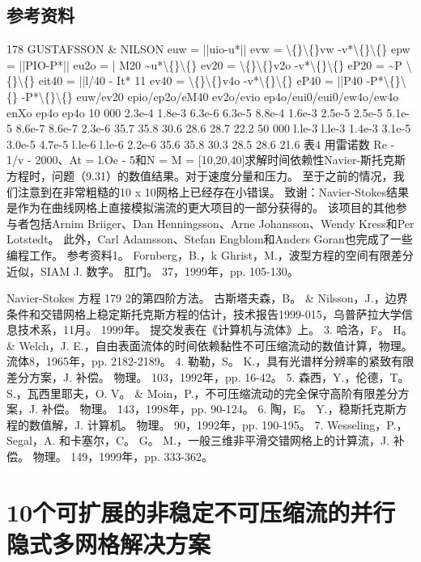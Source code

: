 \documentclass[UTF8,11pt,a4paper,openany,fontset=fandol]{ctexbook}
\begin{document}
\section{参考资料}
178 GUSTAFSSON \& NILSON euw = ||uio-u*|| evw = \textbackslash\{\}\textbackslash\{\}vw -v*\textbackslash\{\}\textbackslash\{\} epw = ||PIO-P*|| eu2o = | M20 \textasciitilde{}u*\textbackslash\{\}\textbackslash\{\} ev20 = \textbackslash\{\}\textbackslash\{\}v2o -v*\textbackslash\{\}\textbackslash\{\} eP20 = \textasciitilde{}P \textbackslash\{\}\textbackslash\{\} eit40 = ||l/40 - It* 11 ev40 = \textbackslash\{\}\textbackslash\{\}v4o -v*\textbackslash\{\}\textbackslash\{\} eP40 = ||P40 -P*\textbackslash\{\}\textbackslash\{\} -P*\textbackslash\{\}\textbackslash\{\} euw/ev20 epio/ep2o/eM40 ev2o/evio ep4o/eui0/eui0/ew4o/ew4o enXo ep4o ep4o 10 000 2.3e-4 1.8e-3 6.3e-6 6.3e-5 8.8e-4 1.6e-3 2.5e-5 2.5e-5 5.1e-5 8.6e-7 8.6e-7 2.3e-6 35.7 35.8 30.6 28.6 28.7 22.2 50 000 l.le-3 l.le-3 1.4e-3 3.1e-5 3.0e-5 4.7e-5 l.le-6 l.le-6 2.2e-6 35.6 35.8 30.3 28.5 28.6 21.6 表4 用雷诺数 Re - 1/v - 2000、At = l.Oe - 5和N = M = [10,20,40]求解时间依赖性Navier-斯托克斯方程时，问题（9.31）的数值结果。对于速度分量和压力。 至于之前的情况，我们注意到在非常粗糙的10 x 10网格上已经存在小错误。 致谢：Navier-Stokes结果是作为在曲线网格上直接模拟湍流的更大项目的一部分获得的。 该项目的其他参与者包括Arnim Briiger、Dan Henningsson、Arne Johansson、Wendy Kress和Per Lotstedt。 此外，Carl Adamsson、Stefan Engblom和Anders Goran也完成了一些编程工作。 参考资料1。 Fornberg，B.，k Ghrist，M.，波型方程的空间有限差分近似，SIAM J. 数字。 肛门。 37，1999年，pp. 105-130。

Navier-Stokes 方程 179 2的第四阶方法。 古斯塔夫森，B。 \& Nilsson，J.，边界条件和交错网格上稳定斯托克斯方程的估计，技术报告1999-015，乌普萨拉大学信息技术系，11月。 1999年。 提交发表在《计算机与流体》上。 3. 哈洛，F。 H。 \& Welch，J. E.，自由表面流体的时间依赖黏性不可压缩流动的数值计算，物理。 流体8，1965年，pp. 2182-2189。 4. 勒勒，S。 K.，具有光谱样分辨率的紧致有限差分方案，J. 补偿。 物理。 103，1992年，pp. 16-42。 5. 森西，Y.，伦德，T。 S.，瓦西里耶夫，O. V。 \& Moin，P.，不可压缩流动的完全保守高阶有限差分方案，J. 补偿。 物理。 143，1998年，pp. 90-124。 6. 陶，E。 Y.，稳斯托克斯方程的数值解，J. 计算机。 物理。 90，1992年，pp. 190-195。 7. Wesseling，P.，Segal，A. 和卡塞尔，C。 G。 M.，一般三维非平滑交错网格上的计算流，J. 补偿。 物理。 149，1999年，pp. 333-362。

\clearpage
\chapter{10个可扩展的非稳定不可压缩流的并行隐式多网格解决方案}
\end{document}
